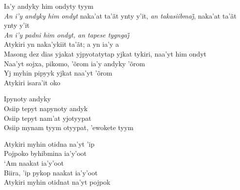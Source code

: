  \smallskip
 \begin{center}\end{center}
 \smallskip
 
\noindent   Ia'y andyky him ondyty tyym\\
  \textit{An i’y andyky him ondyt} naka’at ta’ãt ynty y’it, \textit{an takasiibmaj̃}, naka’at ta’ãt ynty y’it\\
  \textit{An i’y padni him ondyt, an tapese tygngaj̃}\\
  Atykiri yn naka'ykiit ta'ãt; a yn ia'y a\\
  Masong dez dias yjakat yjpyotatytap yjkat tykiri, naa'yt him ondyt\\
  Naa'yt sojxa, pikomo, 'õrom ia'y andyky 'õrom\\
  Yj myhin pipyyk yjkat naa'yt 'õrom\\
  Atykiri isara'it oko
 
 \smallskip
 \begin{center}\end{center}
 \smallskip
 
\noindent   Ipynoty andyky\\
  Osiip tepyt napynoty andyk\\
  Osiip tepyt nam'at yjotyypat\\
  Osiip mynam tyym otyypat, 'ewokete tyym
 
 \smallskip
 \begin{center}\end{center}
 \smallskip
 
\noindent   Atykiri myhin otidna na'yt 'ip\\
  Pojpoko byhibmina ia'y'oot\\
  `Am naakat ia'y'oot\\
  Biira, 'ip pykop naakat ia'y'oot\\
  Atykiri myhin otidnat na'yt pojpok
 
